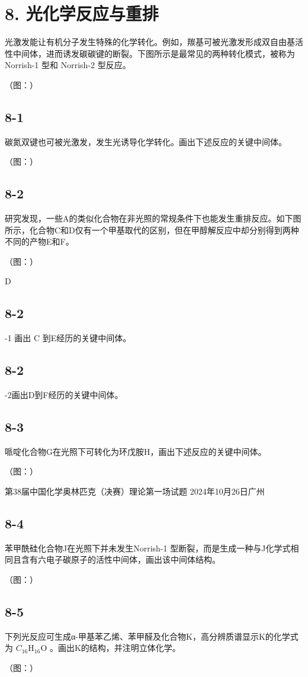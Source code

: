 \section*{8. 光化学反应与重排}
光激发能让有机分子发生特殊的化学转化。例如，羰基可被光激发形成双自由基活性中间体，进而诱发碳碳键的断裂。下图所示是最常见的两种转化模式，被称为Norrish-1 型和 Norrish-2 型反应。

（图：）

\subsection*{8-1}
碳氮双键也可被光激发，发生光诱导化学转化。画出下述反应的关键中间体。

（图：）

\subsection*{8-2}
研究发现，一些A的类似化合物在非光照的常规条件下也能发生重排反应。如下图所示，化合物C和D仅有一个甲基取代的区别，但在甲醇解反应中却分别得到两种不同的产物E和F。

（图：）

D

\subsection*{8-2}
-1 画出 C 到E经历的关键中间体。

\subsection*{8-2}
-2画出D到F经历的关键中间体。

\subsection*{8-3}
哌啶化合物G在光照下可转化为环戊胺H，画出下述反应的关键中间体。

（图：）

第38届中国化学奥林匹克（决赛）理论第一场试题 2024年10月26日广州

\subsection*{8-4}
苯甲酰硅化合物J在光照下并未发生Norrish-1 型断裂，而是生成一种与J化学式相同且含有六电子碳原子的活性中间体，画出该中间体结构。

（图：）

\subsection*{8-5}
下列光反应可生成α-甲基苯乙烯、苯甲醛及化合物K，高分辨质谱显示K的化学式为 $C _ { 1 6 } \mathrm { H } _ { 1 6 } \mathrm { O }$ 。画出K的结构，并注明立体化学。

（图：）
